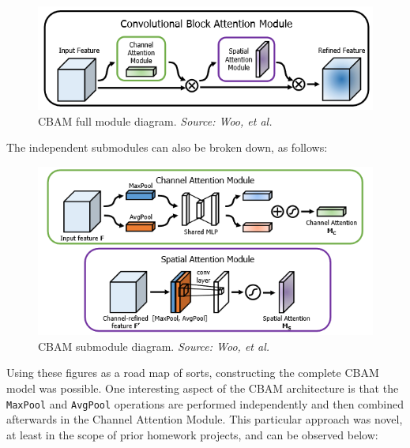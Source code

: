 \documentclass{article}
\begin{document}
\begin{figure}[H]
    \centering
    \includegraphics[width=5in]{csci-8920/hw-4/images/cbam-full-diagram.png}
    \caption{CBAM full module diagram. \textit{Source: Woo, et al.} \cite{Woo2018CBAM:Module}}
    \label{fig:cbam_full_diag}
\end{figure}

The independent submodules can also be broken down, as follows:

\begin{figure}[H]
    \centering
    \includegraphics[width=5in]{csci-8920/hw-4/images/cbam-module-diagrams.png}
    \caption{CBAM submodule diagram. \textit{Source: Woo, et al.} \cite{Woo2018CBAM:Module}}
    \label{fig:cbam_mod_diag}
\end{figure}

Using these figures as a road map of sorts, constructing the complete CBAM model was possible.
One interesting aspect of the CBAM architecture is that the \lstinline{MaxPool} and \lstinline{AvgPool} operations are performed independently and then combined afterwards in the Channel Attention Module.
This particular approach was novel, at least in the scope of prior homework projects, and can be observed below:
\end{document}
